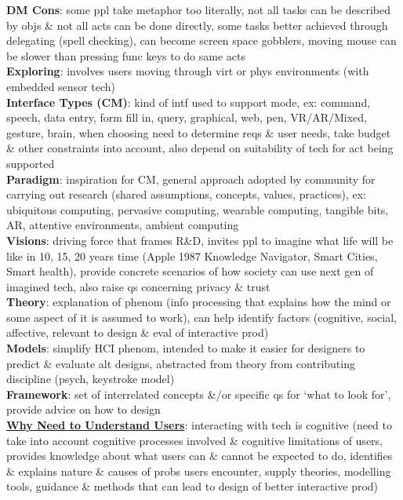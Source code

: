 \documentclass[a4paper]{article}
\begin{document}
\begin{multicols}{3}
        \textbf{DM Cons}: some ppl take metaphor too literally, not all tasks can be described by objs \& not all acts can be done directly, some tasks better achieved through delegating (spell checking), can become screen space gobblers, moving mouse can be slower than pressing func keys to do same acts\\
        \textbf{Exploring}: involves users moving through virt or phys environments (with embedded sensor tech)\\
        \textbf{Interface Types (CM)}: kind of intf used to support mode, ex: command, speech, data entry, form fill in, query, graphical, web, pen, VR/AR/Mixed, gesture, brain, when choosing need to determine reqs \& user needs, take budget \& other constraints into account, also depend on suitability of tech for act being supported\\
        \textbf{Paradigm}: inspiration for CM, general approach adopted by community for carrying out research (shared assumptions, concepts, values, practices), ex: ubiquitous computing, pervasive computing, wearable computing, tangible bits, AR, attentive environments, ambient computing\\
        \textbf{Visions}: driving force that frames R\&D, invites ppl to imagine what life will be like in 10, 15, 20 years time (Apple 1987 Knowledge Navigator, Smart Cities, Smart health), provide concrete scenarios of how society can use next gen of imagined tech, also  raise qs concerning privacy \& trust\\
        \textbf{Theory}: explanation of phenom (info processing that explains how the mind or some aspect of it is assumed to work), can help identify factors (cognitive, social, affective, relevant to design \& eval of interactive prod)\\
        \textbf{Models}: simplify HCI phenom, intended to make it easier for designers to predict \& evaluate alt designs, abstracted from theory from contributing discipline (psych, keystroke model)\\
        \textbf{Framework}: set of interrelated concepts \&/or specific qs for `what to look for', provide advice on how to design\\
        \underline{\textbf{Why Need to Understand Users}}: interacting with tech is cognitive (need to take into account cognitive processes involved \& cognitive limitations of users, provides knowledge about what users can \& cannot be expected to do, identifies \& explains nature \& causes of probs users encounter, supply theories, modelling tools, guidance \& methods that can lead to design of better interactive prod)\\

\end{multicols}
\end{document}
